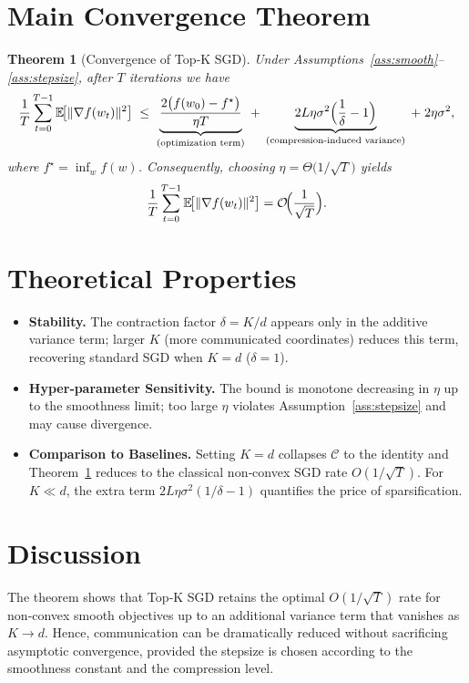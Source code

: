 \documentclass{article}
\newtheorem{theorem}{Theorem}
\newcommand{\E}{\mathbb{E}}
\newcommand{\C}{\mathcal{C}}
\begin{document}
\section*{Main Convergence Theorem}
\begin{theorem}[Convergence of Top‑K SGD]\label{thm:main}
Under Assumptions~\ref{ass:smooth}–\ref{ass:stepsize}, after $T$ iterations we have
\[
\frac{1}{T}\sum_{t=0}^{T-1}\E\!\bigl[\|\nabla f(w_t)\|^{2}\bigr]
\;\le\;
\underbrace{\frac{2\bigl(f(w_0)-f^{\star}\bigr)}{\eta T}}_{(\text{optimization term})}
\;+\;
\underbrace{2L\eta\sigma^{2}\Bigl(\frac{1}{\delta} -1\Bigr)}_{(\text{compression‑induced variance})}
\;+\;
2\eta\sigma^{2},
\]
where $f^{\star}=\inf_{w}f(w)$.  Consequently, choosing $\eta =\Theta\!\bigl(1/\sqrt{T}\bigr)$ yields
\[
\frac{1}{T}\sum_{t=0}^{T-1}\E\!\bigl[\|\nabla f(w_t)\|^{2}\bigr]=
\mathcal{O}\!\Bigl(\frac{1}{\sqrt{T}}\Bigr).
\]
\end{theorem}

\section*{Theoretical Properties}
\begin{itemize}
\item \textbf{Stability.} The contraction factor $\delta=K/d$ appears only in the additive variance term; larger $K$ (more communicated coordinates) reduces this term, recovering standard SGD when $K=d$ ($\delta=1$).
\item \textbf{Hyper‑parameter Sensitivity.} The bound is monotone decreasing in $\eta$ up to the smoothness limit; too large $\eta$ violates Assumption~\ref{ass:stepsize} and may cause divergence.
\item \textbf{Comparison to Baselines.} Setting $K=d$ collapses $\C$ to the identity and Theorem~\ref{thm:main} reduces to the classical non‑convex SGD rate $O(1/\sqrt{T})$. For $K\ll d$, the extra term $2L\eta\sigma^{2}(1/\delta-1)$ quantifies the price of sparsification.
\end{itemize}

\section*{Discussion}
The theorem shows that Top‑K SGD retains the optimal $O(1/\sqrt{T})$ rate for non‑convex smooth objectives up to an additional variance term that vanishes as $K\to d$.  Hence, communication can be dramatically reduced without sacrificing asymptotic convergence, provided the stepsize is chosen according to the smoothness constant and the compression level.
\end{document}

